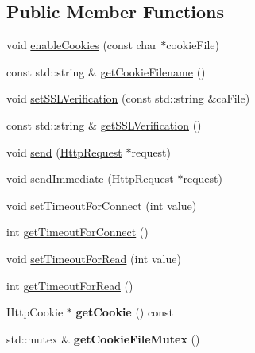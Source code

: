 \subsection*{Public Member Functions}
\begin{DoxyCompactItemize}
\item 
void \hyperlink{classnetwork_1_1HttpClient_a522608f82b2dad340931c2d83265a1bf}{enable\+Cookies} (const char $\ast$cookie\+File)
\item 
const std\+::string \& \hyperlink{classnetwork_1_1HttpClient_ae97920b1e10b7617ccbde99cf5c2c2a0}{get\+Cookie\+Filename} ()
\item 
void \hyperlink{classnetwork_1_1HttpClient_a55b52ba7821dd0520eed769123df1f16}{set\+S\+S\+L\+Verification} (const std\+::string \&ca\+File)
\item 
const std\+::string \& \hyperlink{classnetwork_1_1HttpClient_a80bc5e78ec453afdc746c0580e414ccc}{get\+S\+S\+L\+Verification} ()
\item 
void \hyperlink{classnetwork_1_1HttpClient_a912e8ba506a485bf5fcc2d06293f118b}{send} (\hyperlink{classnetwork_1_1HttpRequest}{Http\+Request} $\ast$request)
\item 
void \hyperlink{classnetwork_1_1HttpClient_a1a8920937cbbbcdc17f64ad431ac9c63}{send\+Immediate} (\hyperlink{classnetwork_1_1HttpRequest}{Http\+Request} $\ast$request)
\item 
void \hyperlink{classnetwork_1_1HttpClient_a1cf782d82d843941ea049e6fe8d6d231}{set\+Timeout\+For\+Connect} (int value)
\item 
int \hyperlink{classnetwork_1_1HttpClient_abbc0c505d0d0a323d049a26f35c38329}{get\+Timeout\+For\+Connect} ()
\item 
void \hyperlink{classnetwork_1_1HttpClient_a30fa6578fdbe46651312fd7ead04981e}{set\+Timeout\+For\+Read} (int value)
\item 
int \hyperlink{classnetwork_1_1HttpClient_a3398cc5ce8e6780267cd9227425331f5}{get\+Timeout\+For\+Read} ()
\item 
\mbox{\label{classnetwork_1_1HttpClient_afef8932c5ac7e1fa82c5bfb7288f0bf8}} 
Http\+Cookie $\ast$ {\bfseries get\+Cookie} () const
\item 
\mbox{\label{classnetwork_1_1HttpClient_aab2e0b6eef1dddd744430241a040c2c5}} 
std\+::mutex \& {\bfseries get\+Cookie\+File\+Mutex} ()
\item 
\mbox{\label{classnetwork_1_1HttpClient_a3b669b262b2dc49db18909e1b8648fbb}} 

\end{DoxyCompactItemize}
